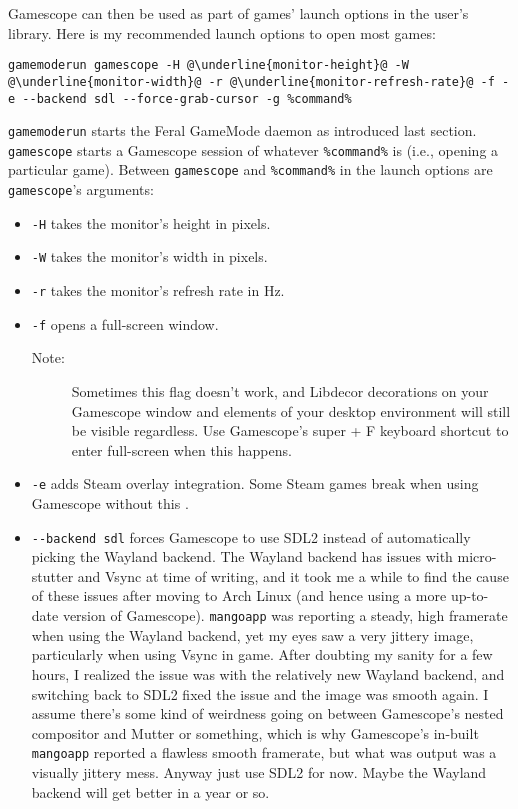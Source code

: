 \documentclass[a4paper]{article}
\begin{document}
Gamescope can then be used as part of games' launch options in the user's library.
Here is my recommended launch options to open most games:
\begin{lstlisting}[escapechar=@]
gamemoderun gamescope -H @\underline{monitor-height}@ -W @\underline{monitor-width}@ -r @\underline{monitor-refresh-rate}@ -f -e --backend sdl --force-grab-cursor -g %command%
\end{lstlisting}
\lstinline|gamemoderun| starts the Feral GameMode daemon as introduced last section.
\lstinline|gamescope| starts a Gamescope session of whatever \lstinline|%command%| is (i.e., opening a particular game).
Between \lstinline|gamescope| and \lstinline|%command%| in the launch options are \lstinline|gamescope|'s arguments:
\begin{itemize}
    \item \lstinline|-H| takes the monitor's height in pixels.
    \item \lstinline|-W| takes the monitor's width in pixels.
    \item \lstinline|-r| takes the monitor's refresh rate in Hz.
    \item \lstinline|-f| opens a full-screen window.
    \begin{description}
        \item[Note:] Sometimes this flag doesn't work, and Libdecor decorations on your Gamescope window and elements of your desktop environment will still be visible regardless. Use Gamescope's super + F keyboard shortcut to enter full-screen when this happens.
    \end{description}
    \item \lstinline|-e| adds Steam overlay integration. Some Steam games break when using Gamescope without this \cite{arch-wiki-gamescope}.
    \item \lstinline|--backend sdl| forces Gamescope to use SDL2 instead of automatically picking the Wayland backend. The Wayland backend has issues with micro-stutter and Vsync at time of writing, and it took me a while to find the cause of these issues after moving to Arch Linux (and hence using a more up-to-date version of Gamescope). \lstinline|mangoapp| was reporting a steady, high framerate when using the Wayland backend, yet my eyes saw a very jittery image, particularly when using Vsync in game. After doubting my sanity for a few hours, I realized the issue was with the relatively new Wayland backend, and switching back to SDL2 fixed the issue and the image was smooth again. I assume there's some kind of weirdness going on between Gamescope's nested compositor and Mutter or something, which is why Gamescope's in-built \lstinline|mangoapp| reported a flawless smooth framerate, but what was output was a visually jittery mess. Anyway just use SDL2 for now. Maybe the Wayland backend will get better in a year or so.

\end{itemize}
\end{document}
